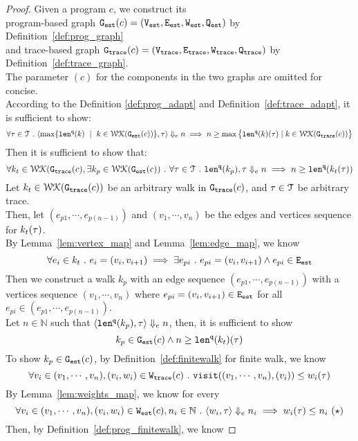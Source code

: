 \begin{proof}
Given a program ${c}$, 
we construct its 
\\
program-based graph $\mathtt{{G_{est}}}({c}) = (\mathtt{{V_{est}}}, \mathtt{{E_{est}}}, \mathtt{{W_{est}}}, \mathtt{{Q_{est}}})$
by Definition~\ref{def:prog_graph}
\\ and 
trace-based graph $\mathtt{{G_{trace}}}({c}) = (\mathtt{{V_{trace}}}, \mathtt{{E_{trace}}}, \mathtt{{W_{trace}}}, \mathtt{{Q_{trace}}})$  by Definition~\ref{def:trace_graph}.
\\
The parameter $(c)$ for the components in the two graphs are omitted for concise.
\\
%
According to the Definition \ref{def:prog_adapt} and Definition~\ref{def:trace_adapt}, it is sufficient to show:
%
$$
\forall \trace \in \mathcal{T} \st
\config{\max\left\{ \qlen(k) \ \mid \  k\in \walks(\progG({c}))\right \}
, \trace } \earrow n \implies
n \geq
\max \big 
\{ \qlen(k)(\trace) \mid k \in \walks(\traceG(c)) \big \} 
$$
%
%
Then it is sufficient to show that:
\[
  \forall 
  k_t \in \mathcal{WK}(\mathtt{{G_{trace}}}({c}),
  \exists k_p \in \mathcal{WK}(\mathtt{{G_{est}}}({c})) 
  ~.~ \forall \mathtt{\tau} \in \mathcal{T} ~.~
  \mathtt{len}^{\tt q}(k_p), \mathtt{\tau} \Downarrow_e n
   \implies 
  n \geq \mathtt{len}^{\tt q}(k_t(\mathtt{\tau}))
\]
%
Let $k_t\in \mathcal{WK}(\mathtt{{G_{trace}}}(c))$ be an arbitrary walk in $\mathtt{{G_{trace}}}(c)$, 
and $\mathtt{\tau} \in \mathcal{T}$ be arbitrary trace.
\\
Then, 
let $(e_{p1}, \cdots, e_{p(n-1)}) $ and
$(v_1, \cdots, v_n)$ be the edges and vertices sequence  for $k_t(\mathtt{\tau})$.
\\
By Lemma~\ref{lem:vertex_map} and Lemma~\ref{lem:edge_map}, we know
%
\[
  \forall e_i \in k_t ~.~ e_i = (v_i, v_{i + 1}) \implies
  \exists e_{pi} ~.~ e_{pi} = (v_i, v_{i + 1}) \land e_{pi} \in \mathtt{{E_{est}}}
  \]
Then we construct a walk $k_p$ with an edge sequence $(e_{p1}, \cdots, e_{p(n-1)}) $ 
with a vertices sequence $(v_1, \cdots, v_n)$ where 
$e_{pi} = (v_i, v_{i + 1}) \in \mathtt{{E_{est}}}$ for all $e_{pi} \in (e_{p1}, \cdots, e_{p(n-1)})$.
\\
Let $n \in \mathbb{N}$ such that 
$\langle \mathtt{len}^{\tt q}(k_p), \mathtt{\tau} \rangle \Downarrow_e n$,
then, it is sufficient to show
\[
  k_p \in \mathtt{{G_{est}}}(c) \land n \geq \mathtt{len}^{\tt q}(k_t)(\mathtt{\tau})
  \] 
To show $k_p \in \mathtt{{G_{est}}}(c)$, by Definition~\ref{def:finitewalk} for finite walk, 
we know
\[
  \forall v_i \in (v_1, \cdots, v_n), (v_i, w_i) \in \mathtt{{W_{trace}}}(c) 
  ~.~
  \mathtt{visit}((v_1, \cdots, v_n), (v_i)) \leq w_i(\mathtt{\tau})
\]
%
By Lemma~\ref{lem:weights_map}, we know for every 
\[
  \forall v_i \in (v_1, \cdots, v_n), (v_i, w_i) \in \progW(c), n_i \in \mathbb{N} 
  \st
  \config{w_i, \trace} \earrow n_i
  \implies
   w_i(\trace) \leq n_i ~ (\star)
\]
Then, by Definition~\ref{def:prog_finitewalk}, we know

\end{proof}
